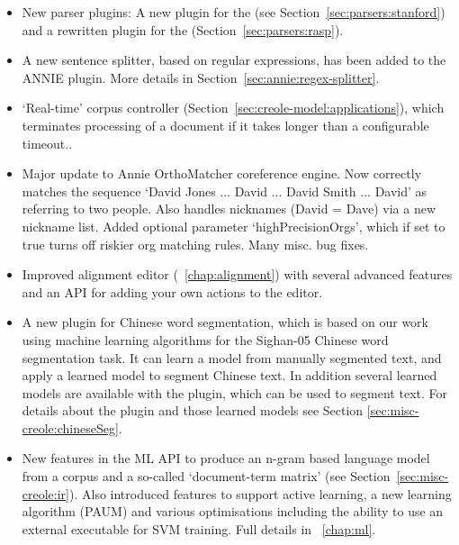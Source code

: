 
\begin{itemize}
\item New parser plugins: A new plugin for the 
  (see Section~\ref{sec:parsers:stanford}) and a rewritten plugin for the 
   (Section~\ref{sec:parsers:rasp}).

\item A new sentence splitter, based on regular expressions, has been added to
  the ANNIE plugin. More details in Section~\ref{sec:annie:regex-splitter}.

\item `Real-time' corpus controller (Section~\ref{sec:creole-model:applications}), which
  terminates processing of a document if it takes longer than a configurable
  timeout..
  
\item Major update to Annie OrthoMatcher coreference engine.  Now correctly matches 
   the sequence `David Jones ... David ... David Smith ... David' as referring to 
   two people.  Also handles nicknames (David = Dave) via a new nickname list.  Added
   optional parameter `highPrecisionOrgs', which if set to true turns off riskier org 
   matching rules.  Many misc. bug fixes.

\item Improved alignment editor (\Chapthing~\ref{chap:alignment}) with several
  advanced features and an API for adding your own actions to the editor.

\item A new plugin for Chinese word segmentation, which is
  based on our work using machine learning algorithms for the Sighan-05 Chinese
  word segmentation task. It can learn a model from manually segmented text, and
  apply a learned model to segment Chinese text. In addition several learned
  models are available with the plugin, which can be used to segment text. For
  details about the plugin and those learned models see Section
  \ref{sec:misc-creole:chineseSeg}.

\item New features in the ML API to produce an n-gram based language model from
  a corpus and a so-called `document-term matrix' (see
  Section~\ref{sec:misc-creole:ir}).  Also introduced features to support active learning,
  a new learning algorithm (PAUM) and various optimisations including the
  ability to use an external executable for SVM training.  Full details in
  \Chapthing~\ref{chap:ml}.


\end{itemize}
